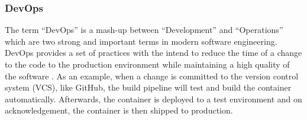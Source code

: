 \subsubsection{DevOps}

The term ``DevOps'' is a mash-up between ``Development'' and ``Operations''
which are two strong and important terms in modern software engineering.
DevOps provides a set of practices with the intend to reduce the time
of a change to the code to the production environment
while maintaining a high quality of the software \cite{bass:devops}. As an example, when a change
is committed to the version control system (VCS), like GitHub, the build pipeline
will test and build the container automatically. Afterwards, the container
is deployed to a test environment and on acknowledgement, the container is
then shipped to production.
